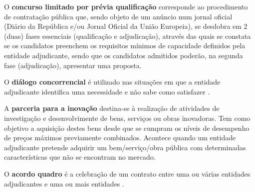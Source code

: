 \begin{my_enumerate}
	
	\item O \textbf{concurso limitado por prévia qualificação} corresponde ao procedimento de contratação pública que, sendo objeto de um anúncio num jornal oficial (Diário da República e/ou Jornal Oficial da União Europeia), se desdobra em 2 (duas) fases essenciais (qualificação e adjudicação), através das quais se constata se os candidatos preenchem os requisitos mínimos de capacidade definidos pela entidade adjudicante, sendo que os candidatos admitidos poderão, na segunda fase (adjudicação), apresentar uma proposta\cite{previaqual}.
	
	\item O \textbf{diálogo concorrencial} é utilizado nas situações em que a entidade adjudicante identifica uma necessidade e não sabe como satisfazer \cite{dialogoconc}. 
	
	\item A \textbf{parceria para a inovação} destina-se à realização de atividades de investigação e desenvolvimente de bens, serviços ou obras inovadoras. Tem como objetivo a aquisição destes bens desde que se cumpram os níveis de desempenho de preços máximos
	previamente combinados. Acontece quando um entidade adjudicante pretende adquirir um bem/serviço/obra
	pública com determinadas características que não se encontram no mercado. 
	
	
	\item O \textbf{acordo quadro} é a celebração de um contrato entre uma ou várias entidades adjudicantes e uma ou mais entidades \cite{acordoquadro}. 
	
	
\end{my_enumerate}




